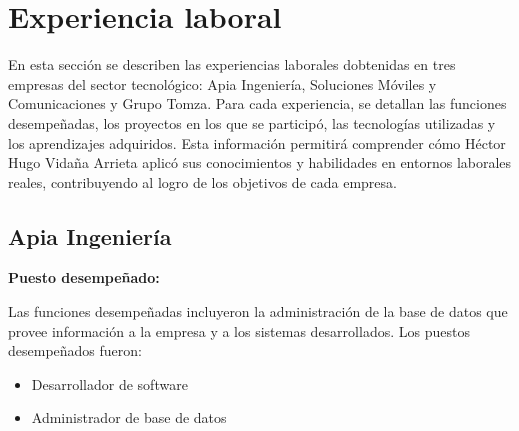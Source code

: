 \documentclass[protocolo.tex]{subfiles}
\begin{document}
\newpage 
\section{Experiencia laboral}

En esta sección se describen las experiencias laborales 
dobtenidas en tres empresas del sector tecnológico: 
Apia Ingeniería, Soluciones Móviles y Comunicaciones y Grupo Tomza. 
Para cada experiencia, se detallan las funciones desempeñadas, 
los proyectos en los que se participó, las tecnologías utilizadas y 
los aprendizajes adquiridos. Esta información permitirá comprender cómo Héctor Hugo Vidaña Arrieta aplicó sus conocimientos y habilidades en entornos laborales reales, contribuyendo al logro de los objetivos de cada empresa.

\subsection{Apia Ingeniería}

\textbf{Puesto desempeñado:} 

Las funciones desempeñadas incluyeron la administración de la base de datos que provee información a la empresa y a los sistemas desarrollados.
Los puestos desempeñados fueron:

\begin{itemize}
\item Desarrollador de software
\item Administrador de base de datos
\end{itemize}
\end{document}

